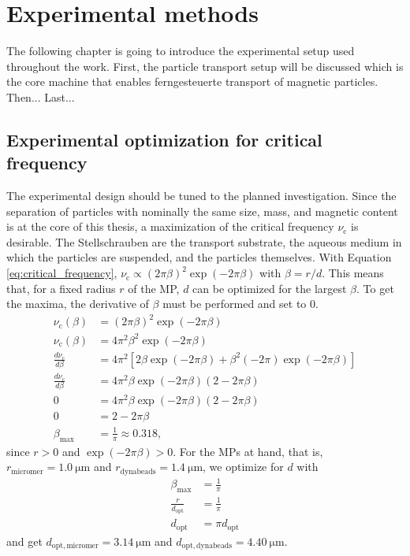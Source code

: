 \chapter{Experimental methods}\label{chapter:experimental}
The following chapter is going to introduce the experimental setup used throughout the work.
First, the particle transport setup will be discussed which is the core machine that enables ferngesteuerte transport of magnetic particles.  
Then...
Last...

\section{Experimental optimization for critical frequency}
The experimental design should be tuned to the planned investigation.
Since the separation of particles with nominally the same size, mass, and magnetic content is at the core of this thesis, a maximization of the critical frequency $\nu_\mathrm{c}$ is desirable.
The Stellschrauben are the transport substrate, the aqueous medium in which the particles are suspended, and the particles themselves.
With Equation \ref{eq:critical_frequency}, $\nu_\mathrm{c} \propto (2\pi \beta)^2\exp(-2\pi \beta)$ with $\beta = r/d$.
This means that, for a fixed radius $r$ of the \ac{MP}, $d$ can be optimized for the largest $\beta$.
To get the maxima, the derivative of $\beta$ must be performed and set to 0.
\begin{align}
    \nu_\mathrm{c}(\beta) &= (2\pi \beta)^2\exp(-2\pi \beta)\\ 
    \nu_\mathrm{c}(\beta) &= 4\pi^2 \beta^2 \exp(-2\pi\beta)\\
    \frac{d \nu_\mathrm{c}}{d \beta}&= 4 \pi^2 [2 \beta \exp(-2 \pi \beta) + \beta^2 (-2\pi)\exp(-2\pi \beta)]\\
    \frac{d \nu_\mathrm{c}}{d \beta}&= 4\pi^2 \beta \exp(-2\pi \beta) (2-2\pi \beta)\\
    0&= 4\pi^2 \beta \exp(-2\pi \beta) (2-2\pi \beta)\\
    0&= 2-2\pi \beta \\
    \beta_\mathrm{max} &= \frac{1}{\pi} \approx 0.318,
\end{align}
since $r>0$ and $\exp(-2\pi\beta)>0$.
For the \acp{MP} at hand, that is, $r_\mathrm{micromer} = \SI{1.0}{\micro\m}$ and $r_\mathrm{dynabeads} = \SI{1.4}{\micro\m}$, we optimize for $d$ with
\begin{align}
    \beta_\mathrm{max} &= \frac{1}{\pi}\\
    \frac{r}{d_\mathrm{opt}} &= \frac{1}{\pi}\\
    d_\mathrm{opt} &= \pi d_\mathrm{opt}
\end{align}
and get $d_\mathrm{opt, micromer} = \SI{3.14}{\micro\meter}$ and $d_\mathrm{opt, dynabeads} = \SI{4.40}{\micro\meter}$.

